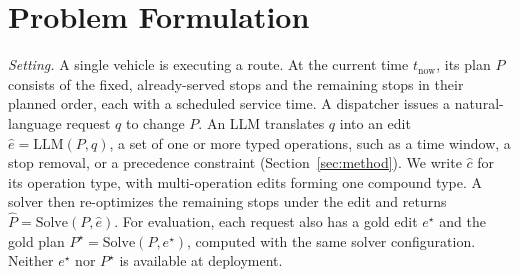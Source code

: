 \section{Problem Formulation}\label{sec:problem}

\textit{Setting.} A single vehicle is executing a route. At the current time $t_{\mathrm{now}}$, its plan $P$
consists of the fixed, already-served stops and the remaining stops in their planned order, each with a scheduled service time.
A dispatcher issues a natural-language request $q$ to change $P$. An LLM
translates $q$ into an edit $\hat{e} = \mathrm{LLM}(P, q)$, a set of one or more typed operations,
such as a time window, a stop removal, or a precedence constraint (Section~\ref{sec:method}). We
write $\hat{c}$ for its operation type, with multi-operation edits forming one compound type. A
solver then re-optimizes the remaining stops under the edit and returns
$\hat{P} = \mathrm{Solve}(P, \hat{e})$. For evaluation, each request also has a gold edit $e^\star$
and the gold plan $P^\star = \mathrm{Solve}(P, e^\star)$, computed with the same solver
configuration. Neither $e^\star$ nor $P^\star$ is available at deployment.

